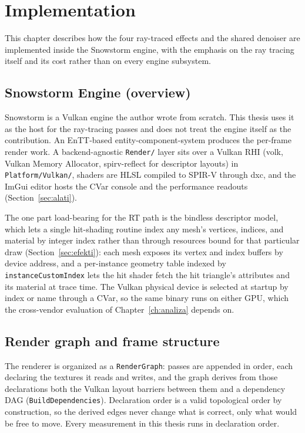 \chapter{Implementation}
\label{ch:implementacija}


This chapter describes how the four ray-traced effects and the shared denoiser are implemented inside
the Snowstorm engine, with the emphasis on the ray tracing itself and its cost rather than on every
engine subsystem.

\section{Snowstorm Engine (overview)}
\label{sec:engine}

Snowstorm is a Vulkan engine the author wrote from scratch. This thesis uses it as the host for the
ray-tracing passes and does not treat the engine itself as the contribution. An EnTT-based
entity-component-system produces the per-frame render work. A backend-agnostic \texttt{Render/} layer
sits over a Vulkan RHI (volk, Vulkan Memory Allocator, spirv-reflect for descriptor layouts) in
\texttt{Platform/Vulkan/}, shaders are HLSL compiled to SPIR-V through dxc, and the ImGui editor hosts
the CVar console and the performance readouts (Section~\ref{sec:alati}).

The one part load-bearing for the RT path is the bindless descriptor model, which lets a single
hit-shading routine index any mesh's vertices, indices, and material by integer index rather than
through resources bound for that particular draw (Section~\ref{sec:efekti}): each mesh exposes its vertex and index buffers by device address, and a
per-instance geometry table indexed by \texttt{instanceCustomIndex} lets the hit shader fetch the hit
triangle's attributes and its material at trace time. The Vulkan physical device is selected at startup
by index or name through a CVar, so the same binary runs on either GPU, which the cross-vendor
evaluation of Chapter~\ref{ch:analiza} depends on.

\section{Render graph and frame structure}
\label{sec:rendergraph}

The renderer is organized as a \texttt{RenderGraph}: passes are appended in order, each declaring the
textures it reads and writes, and the graph derives from those declarations both the Vulkan layout
barriers between them and a dependency DAG (\texttt{BuildDependencies}). Declaration order is a valid
topological order by construction, so the derived edges never change what is correct, only what would
be free to move. Every measurement in this thesis runs in declaration order.

